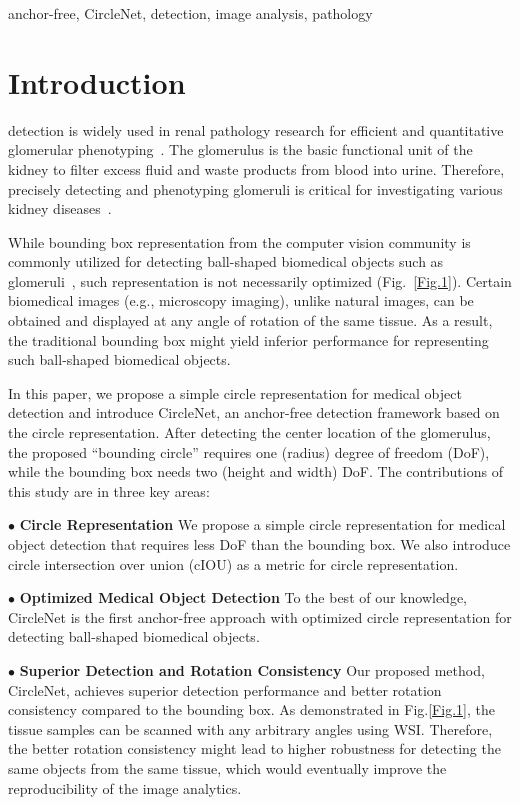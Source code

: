\documentclass[journal]{IEEEtran}
\newcommand{\Fig}{Fig.}
\begin{document}
\begin{IEEEkeywords}
anchor-free, CircleNet, detection, image analysis, pathology
\end{IEEEkeywords}

\section{Introduction}
 detection is widely used in renal pathology research for efficient and quantitative glomerular phenotyping~\cite{huo2021ai}. The glomerulus is the basic functional unit of the kidney to filter excess fluid and waste products from blood into urine. Therefore, precisely detecting and phenotyping glomeruli is critical for investigating various kidney diseases~\cite{d2013rise}. 

While bounding box representation from the computer vision community is commonly utilized for detecting ball-shaped biomedical objects such as glomeruli~\cite{lo2018glomerulus, kawazoe2018faster, heckenauer2020real, rehem2021automatic}, such representation is not necessarily optimized (\Fig~\ref{Fig.1}). Certain biomedical images (e.g., microscopy imaging), unlike natural images, can be obtained and displayed at any angle of rotation of the same tissue. As a result, the traditional bounding box might yield inferior performance for representing such ball-shaped biomedical objects.

In this paper, we propose a simple circle representation for medical object detection and introduce CircleNet, an anchor-free detection framework based on the circle representation. After detecting the center location of the glomerulus, the proposed “bounding circle” requires one (radius) degree of freedom (DoF), while the bounding box needs two (height and width) DoF. The contributions of this study are in three key areas:

$\bullet$ \textbf{Circle Representation} We propose a simple circle representation for medical object detection that requires less DoF than the bounding box. We also introduce circle intersection over union (cIOU) as a metric for circle representation.

$\bullet$ \textbf{Optimized Medical Object Detection} To the best of our knowledge, CircleNet is the first anchor-free approach with optimized circle representation for detecting ball-shaped biomedical objects.  

$\bullet$ \textbf{Superior Detection and Rotation Consistency} Our proposed method, CircleNet, achieves superior detection performance and better rotation consistency compared to the bounding box. As demonstrated in \Fig \ref{Fig.1}, the tissue samples can be scanned with any arbitrary angles using WSI. Therefore, the better rotation consistency might lead to higher robustness for detecting the same objects from the same tissue, which would eventually improve the reproducibility of the image analytics. 
\end{document}
